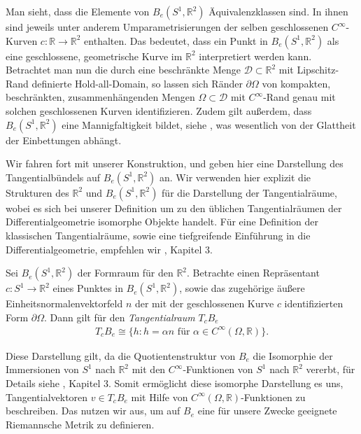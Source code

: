 Man sieht, dass die Elemente von $B_e(S^1,\mathbb{R}^2)$ Äquivalenzklassen sind. In ihnen sind jeweils unter anderem Umparametrisierungen der selben geschlossenen $C^\infty$-Kurven $c: \mathbb{R} \rightarrow \mathbb{R}^2$ enthalten. Das bedeutet, dass ein Punkt in $B_e(S^1,\mathbb{R}^2)$ als eine geschlossene, geometrische Kurve im $\mathbb{R}^2$ interpretiert werden kann. Betrachtet man nun die durch eine beschränkte Menge $\mathcal{D}\subset\mathbb{R}^2$ mit Lipschitz-Rand definierte Hold-all-Domain, so lassen sich Ränder $\partial\Omega$ von kompakten, beschränkten, zusammenhängenden Mengen $\Omega\subset \mathcal{D}$ mit $C^\infty$-Rand genau mit solchen geschlossenen Kurven identifizieren. Zudem gilt außerdem, dass $B_e(S^1,\mathbb{R}^2)$ eine Mannigfaltigkeit bildet, siehe \cite{bfgs2}, was wesentlich von der Glattheit der Einbettungen abhängt.

Wir fahren fort mit unserer Konstruktion, und geben hier eine Darstellung des Tangentialbündels auf $B_e(S^1,\mathbb{R}^2)$ an. Wir verwenden hier explizit die Strukturen des $\mathbb{R}^2$ und $B_e(S^1,\mathbb{R}^2)$ für die Darstellung der Tangentialräume, wobei es sich bei unserer Definition um zu den üblichen Tangentialräumen der Differentialgeometrie isomorphe Objekte handelt. Für eine Definition der klassischen Tangentialräume, sowie eine tiefgreifende Einführung in die Differentialgeometrie, empfehlen wir \cite{LeeDGEO}, Kapitel 3.

\begin{defi}[Tangentialbündel]\label{Tangentialvektor}
Sei $B_e(S^1, \mathbb{R}^2)$ der Formraum für den $\mathbb{R}^2$. Betrachte einen Repräsentant $c: S^1 \rightarrow \mathbb{R}^2$ eines Punktes in $B_e(S^1, \mathbb{R}^2)$, sowie das zugehörige äußere Einheitsnormalenvektorfeld $n$ der mit der geschlossenen Kurve $c$ identifizierten Form $\partial\Omega$. Dann gilt für den \textit{Tangentialraum} $T_cB_e$
\begin{align*}
	T_cB_e \cong \{h : h = \alpha n \text{ für } \alpha \in C^\infty(\Omega,\mathbb{R})\}.
\end{align*}

\end{defi}

Diese Darstellung gilt, da die Quotientenstruktur von $B_e$ die Isomorphie der Immersionen von $S^1$ nach $\mathbb{R}^2$ mit den $C^\infty$-Funktionen von $S^1$ nach $\mathbb{R}^2$ vererbt, für Details siehe \cite{shape_space}, Kapitel 3.
Somit ermöglicht diese isomorphe Darstellung es uns, Tangentialvektoren $v \in T_cB_e$ mit Hilfe von $C^\infty(\Omega, \mathbb{R})$-Funktionen zu beschreiben. Das nutzen wir aus, um auf $B_e$ eine für unsere Zwecke geeignete Riemannsche Metrik zu definieren.


